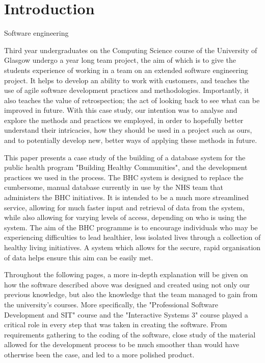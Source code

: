 \documentclass{l3proj}
\begin{document}
\educationalconsent

\newpage
\section{Introduction}

Software engineering

Third year undergraduates on the Computing Science course of the University of Glasgow undergo a year long team project, the aim of which is to give the students experience of working in a team on an extended software engineering project. It helps to develop an ability to work with customers, and teaches the use of agile software development practices and methodologies. Importantly, it also teaches the value of retrospection; the act of looking back to see what can be improved in future. With this case study, our intention was to analyse and explore the methods and practices we employed, in order to hopefully better understand their intricacies, how they should be used in a project such as ours, and to potentially develop new, better ways of applying these methods in future.

This paper presents a case study of the building of a database system for the public health program "Building Healthy Communities", and the development practices we used in the process. The BHC system is designed to replace the cumbersome, manual database currently in use by the NHS team that administers the BHC initiatives. It is intended to be a much more streamlined service, allowing for much faster input and retrieval of data from the system, while also allowing for varying levels of access, depending on who is using the system. The aim of the BHC programme is to encourage individuals who may be experiencing difficulties to lead healthier, less isolated lives through a collection of healthy living initiatives. A system which allows for the secure, rapid organisation of data helps ensure this aim can be easily met.

Throughout the following pages, a more in-depth explanation will be given on how the software described above was designed and created using not only our previous knowledge, but also the knowledge that the team managed to gain from the university's courses. More specifically, the "Professional Software Development and SIT" course and the "Interactive Systems 3" course played a critical role in every step that was taken in creating the software. From requirements gathering to the coding of the software, close study of the material allowed for the development process to be much smoother than would have otherwise been the case, and led to a more polished product.
\end{document}
